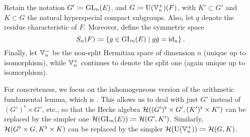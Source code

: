 Retain the notation $G' \coloneqq \operatorname{GL}_n(E)$, and $G \coloneqq \operatorname{U}(\mathbb V_n^+)(F)$,
with $K' \subset G'$ and $K \subset G$ the natural hyperspecial compact subgroups.
Also, let $q$ denote the residue characteristic of $F$.
Moreover, define the symmetric space
\[ S_n(F) \coloneqq \left\{ g \in \operatorname{GL}_n(E) \mid g \bar{g} = \operatorname{id}_n \right\}. \]
Finally, let $\mathbb V_n^-$ be the non-split Hermitian space of dimension $n$
(unique up to isomorphism),
while $\mathbb V_n^+$ continues to denote the split one (again unique up to isomorphism).

For concreteness, we focus on the inhomogeneous version
of the arithmetic fundamental lemma, which is \cite[Conjecture 6.2.1]{ref:AFLspherical}.
This allows us to deal with just $G'$ instead of $(G')^\flat \times G'$, etc.,
so that the Hecke algebra $\mathcal H((G')^\flat \times G', (K')^\flat \times K')$
can be replaced by the simpler one $\mathcal H(\operatorname{GL}_n(E)) \coloneqq \mathcal H(G', K')$.
Similarly, $\mathcal H(G^\flat \times G, K^\flat \times K)$
can be replaced by the simpler $\mathcal H(\operatorname{U}(\mathbb V_n^+)) \coloneqq \mathcal H(G, K)$.

